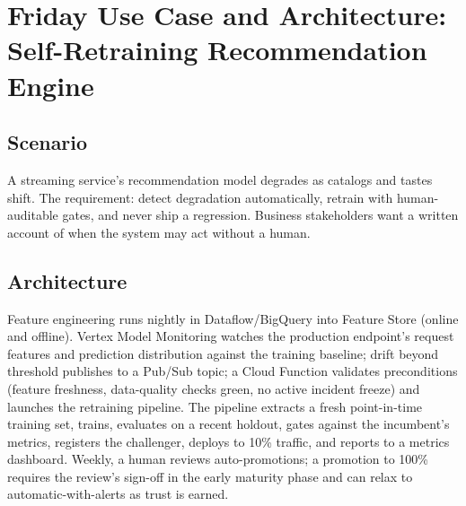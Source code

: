 \section{Friday Use Case and Architecture: Self-Retraining Recommendation Engine}

\subsection{Scenario}
A streaming service's recommendation model degrades as catalogs and tastes shift. The requirement: detect degradation automatically, retrain with human-auditable gates, and never ship a regression. Business stakeholders want a written account of when the system may act without a human.

\subsection{Architecture}
Feature engineering runs nightly in Dataflow/BigQuery into Feature Store (online and offline). Vertex Model Monitoring watches the production endpoint's request features and prediction distribution against the training baseline; drift beyond threshold publishes to a Pub/Sub topic; a Cloud Function validates preconditions (feature freshness, data-quality checks green, no active incident freeze) and launches the retraining pipeline. The pipeline extracts a fresh point-in-time training set, trains, evaluates on a recent holdout, gates against the incumbent's metrics, registers the challenger, deploys to 10\% traffic, and reports to a metrics dashboard. Weekly, a human reviews auto-promotions; a promotion to 100\% requires the review's sign-off in the early maturity phase and can relax to automatic-with-alerts as trust is earned.

